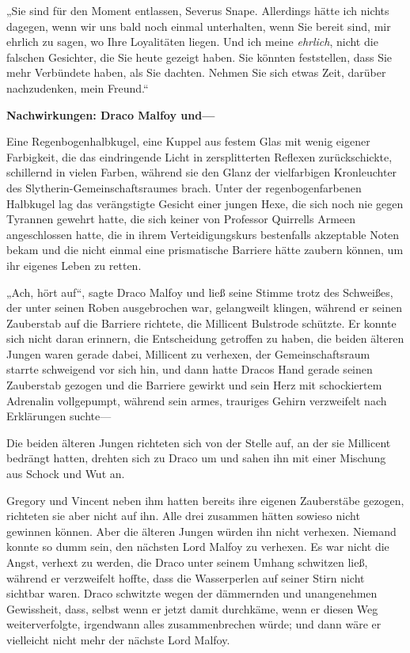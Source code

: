 {„Sie sind für den Moment entlassen, Severus Snape. Allerdings hätte ich nichts dagegen, wenn wir uns bald noch einmal unterhalten, wenn Sie bereit sind, mir ehrlich zu sagen, wo Ihre Loyalitäten liegen. Und ich meine \emph{ehrlich}, nicht die falschen Gesichter, die Sie heute gezeigt haben. Sie könnten feststellen, dass Sie mehr Verbündete haben, als Sie dachten. Nehmen Sie sich etwas Zeit, darüber nachzudenken, mein Freund.“

\textbf{Nachwirkungen: Draco Malfoy und—}

Eine Regenbogenhalbkugel, eine Kuppel aus festem Glas mit wenig eigener Farbigkeit, die das eindringende Licht in zersplitterten Reflexen zurückschickte, schillernd in vielen Farben, während sie den Glanz der vielfarbigen Kronleuchter des Slytherin-Gemeinschaftsraumes brach. Unter der regenbogenfarbenen Halbkugel lag das verängstigte Gesicht einer jungen Hexe, die sich noch nie gegen Tyrannen gewehrt hatte, die sich keiner von Professor Quirrells Armeen angeschlossen hatte, die in ihrem Verteidigungskurs bestenfalls akzeptable Noten bekam und die nicht einmal eine prismatische Barriere hätte zaubern können, um ihr eigenes Leben zu retten.

„Ach, hört auf“, sagte Draco Malfoy und ließ seine Stimme trotz des Schweißes, der unter seinen Roben ausgebrochen war, gelangweilt klingen, während er seinen Zauberstab auf die Barriere richtete, die Millicent Bulstrode schützte. Er konnte sich nicht daran erinnern, die Entscheidung getroffen zu haben, die beiden älteren Jungen waren gerade dabei, Millicent zu verhexen, der Gemeinschaftsraum starrte schweigend vor sich hin, und dann hatte Dracos Hand gerade seinen Zauberstab gezogen und die Barriere gewirkt und sein Herz mit schockiertem Adrenalin vollgepumpt, während sein armes, trauriges Gehirn verzweifelt nach Erklärungen suchte—

Die beiden älteren Jungen richteten sich von der Stelle auf, an der sie Millicent bedrängt hatten, drehten sich zu Draco um und sahen ihn mit einer Mischung aus Schock und Wut an.

Gregory und Vincent neben ihm hatten bereits ihre eigenen Zauberstäbe gezogen, richteten sie aber nicht auf ihn. Alle drei zusammen hätten sowieso nicht gewinnen können. Aber die älteren Jungen würden ihn nicht verhexen. Niemand konnte so dumm sein, den nächsten Lord Malfoy zu verhexen. Es war nicht die Angst, verhext zu werden, die Draco unter seinem Umhang schwitzen ließ, während er verzweifelt hoffte, dass die Wasserperlen auf seiner Stirn nicht sichtbar waren. Draco schwitzte wegen der dämmernden und unangenehmen Gewissheit, dass, selbst wenn er jetzt damit durchkäme, wenn er diesen Weg weiterverfolgte, irgendwann alles zusammenbrechen würde; und dann wäre er vielleicht nicht mehr der nächste Lord Malfoy.

}

